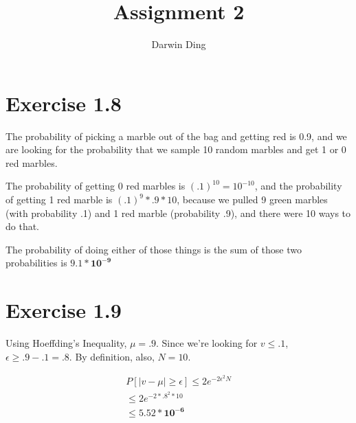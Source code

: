 \documentclass[12pt]{article}
\begin{document}
\title{Assignment 2}
\author{Darwin Ding}
\maketitle

\section*{Exercise 1.8}
The probability of picking a marble out of the bag and getting red is 0.9, and we are looking for the probability that we sample 10 random marbles and get 1 or 0 red marbles.

The probability of getting 0 red marbles is $(.1)^{10} = 10^{-10}$, and the probability of getting 1 red marble is $(.1)^9 * .9 * 10$, because we pulled 9 green marbles (with probability .1) and 1 red marble (probability .9), and there were 10 ways to do that.

The probability of doing either of those things is the sum of those two probabilities is $\boldsymbol{9.1 * 10^{-9}}$

\section*{Exercise 1.9}
Using Hoeffding's Inequality, $\mu = .9$. Since we're looking for $v \le .1$, $\epsilon \ge .9 - .1 = .8$. By definition, also, $N = 10$.

\begin{gather*}
P[|v - \mu| \ge \epsilon] \le 2e^{-2\epsilon^{2}N}
\\ \le 2e^{-2 * .8^2 * 10}
\\ \le \boldsymbol{5.52 * 10^{-6}}
\end{gather*}
\end{document}
